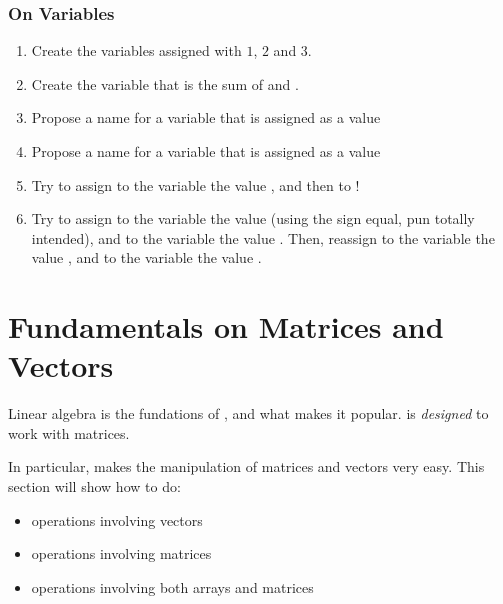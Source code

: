 \subsection{On Variables}
\begin{enumerate}
	\item Create the variables  assigned with $1$, $2$ and $3$.
	\item Create the variable  that is the sum of  and .
	\item Propose a name for a variable that is assigned as a value 
	\item Propose a name for a variable that is assigned as a value 
	\item Try to assign to the variable  the value , and then to !
	\item Try to assign to the variable  the value  (using the sign equal, pun totally intended), and to the variable  the value .
Then, reassign to the variable  the value , and to the variable  the value .

\end{enumerate}






\chapter{Fundamentals on Matrices and Vectors}

Linear algebra is the fundations of \matlab, and what makes it popular.
\matlab is \emph{designed} to work with matrices.

In particular, \matlab makes the manipulation of matrices and vectors very easy.
This section will show how to do:
\begin{itemize}
	\item operations involving vectors
	\item operations involving matrices
	\item operations involving both arrays and matrices
\end{itemize}



